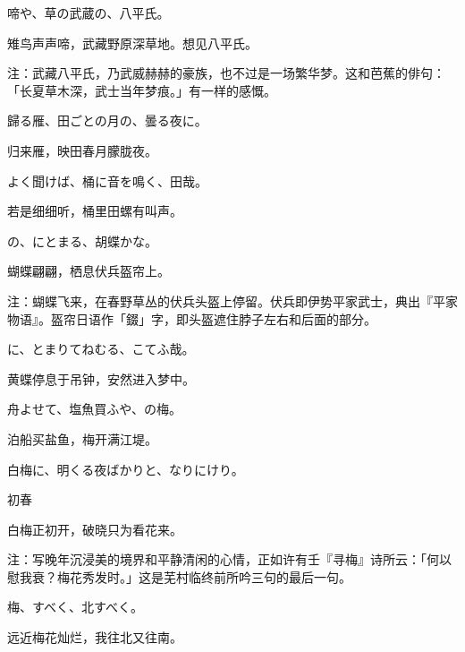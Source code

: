 \begin{haiku}
    {\FH {}啼や、草の武蔵の、八平氏。}

    {\FK 雉鸟声声啼，武藏野原深草地。想见八平氏。}

    {\FT 注：武藏八平氏，乃武威赫赫的豪族，也不过是一场繁华梦。这和芭蕉的俳句：「长夏草木深，武士当年梦痕。」有一样的感慨。}
\end{haiku}

\begin{haiku}
    {\FH 歸る雁、田ごとの月の、曇る夜に。}

    {\FK 归来雁，映田春月朦胧夜。}
\end{haiku}

\begin{haiku}
    {\FH よく聞けば、桶に音を鳴く、田哉。}

    {\FK 若是细细听，桶里田螺有叫声。}
\end{haiku}

\begin{haiku}
    {\FH {}の、にとまる、胡蝶かな。}

    {\FK 蝴蝶翩翩，栖息伏兵盔帘上。}

    {\FT 注：蝴蝶飞来，在春野草丛的伏兵头盔上停留。伏兵即伊势平家武士，典出『平家物语』。盔帘日语作「錣」字，即头盔遮住脖子左右和后面的部分。}
\end{haiku}

\begin{haiku}
    {\FH {}に、とまりてねむる、こてふ哉。}

    {\FK 黄蝶停息于吊钟，安然进入梦中。}
\end{haiku}

\begin{haiku}
    {\FH 舟よせて、塩魚買ふや、の梅。}

    {\FK 泊船买盐鱼，梅开满江堤。}
\end{haiku}

\begin{haiku}
    {\FH 白梅に、明くる夜ばかりと、なりにけり。}

    {\FK 初春}

    {\FK 白梅正初开，破晓只为看花来。}

    {\FT 注：写晚年沉浸美的境界和平静清闲的心情，正如许有壬『寻梅』诗所云：「何以慰我衰？梅花秀发时。」这是芜村临终前所吟三句的最后一句。}
\end{haiku}

\begin{haiku}
    {\FH 梅、すべく、北すべく。}

    {\FK 远近梅花灿烂，我往北又往南。}
\end{haiku}

